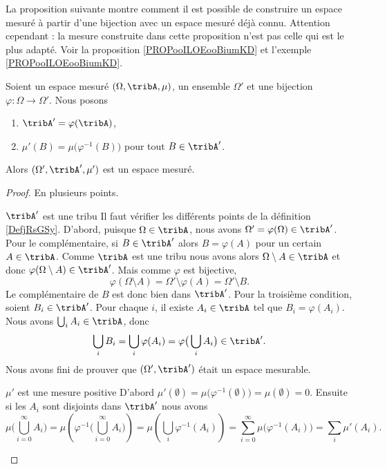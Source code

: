 La proposition suivante montre comment il est possible de construire un espace mesuré à partir d'une bijection avec un espace mesuré déjà connu. Attention cependant : la mesure construite dans cette proposition n'est pas celle qui est le plus adapté. Voir la proposition \ref{PROPooILOEooBiumKD} et l'exemple \ref{PROPooILOEooBiumKD}.
\begin{proposition}     \label{PROPooXQHTooUxJoyq}
    Soient un espace mesuré \( (\Omega,\tribA,\mu)\), un ensemble \( \Omega'\) et une bijection \( \varphi\colon \Omega\to \Omega'\). Nous posons
    \begin{enumerate}
        \item
            \( \tribA'=\varphi(\tribA)\),
        \item
            \( \mu'(B)=\mu\big( \varphi^{-1}(B) \big)\) pour tout \( B\in\tribA'\).
    \end{enumerate}
    Alors \( (\Omega',\tribA',\mu')\) est un espace mesuré.
\end{proposition}

\begin{proof}
    En plusieurs points.
    \begin{subproof}
        \item[\( \tribA'\) est une tribu]
            Il faut vérifier les différents points de la définition \ref{DefjRsGSy}. D'abord, puisque \( \Omega\in\tribA\), nous avons \( \Omega'=\varphi(\Omega)\in \tribA'\). Pour le complémentaire, si \( B\in\tribA'\) alors \( B=\varphi(A)\) pour un certain \( A\in \tribA\). Comme \( \tribA\) est une tribu nous avons alors \( \Omega\setminus A\in\tribA\) et donc \( \varphi(\Omega\setminus A)\in \tribA'\). Mais comme \( \varphi\) est bijective,
            \begin{equation}
                \varphi(\Omega\setminus A)=\Omega'\setminus\varphi(A)=\Omega'\setminus B.
            \end{equation}
            Le complémentaire de \( B\) est donc bien dans \( \tribA'\). Pour la troisième condition, soient \( B_i\in\tribA'\). Pour chaque \( i\), il existe \( A_i\in \tribA\) tel que \( B_i=\varphi(A_i)\). Nous avons \( \bigcup_iA_i\in \tribA\), donc
            \begin{equation}
                \bigcup_iB_i=\bigcup_i\varphi(A_i)=\varphi\big( \bigcup_iA_i \big)\in \tribA'.
            \end{equation}
            Nous avons fini de prouver que \( (\Omega',\tribA')\) était un espace mesurable.
        \item[\( \mu'\) est une mesure positive]
            D'abord \( \mu'(\emptyset)=\mu\big( \varphi^{-1}(\emptyset) \big)=\mu(\emptyset)=0\). Ensuite si les \( A_i\) sont disjoints dans \( \tribA'\) nous avons
            \begin{equation}
                \mu\big( \bigcup_{i=0}^{\infty}A_i \big)=\mu\left( \varphi^{-1}\big( \bigcup_{i=0}^{\infty}A_i \big) \right)=\mu\left( \bigcup_i\varphi^{-1}(A_i) \right)=\sum_{i=0}^{\infty}\mu\big( \varphi^{-1}(A_i) \big)=\sum_i\mu'(A_i).
            \end{equation}
    \end{subproof}
\end{proof}

